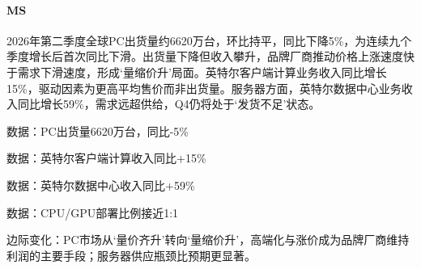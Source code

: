 \documentclass[11pt]{ctexart}
\begin{document}
\paragraph{MS} 2026年第二季度全球PC出货量约6620万台，环比持平，同比下降5\%，为连续九个季度增长后首次同比下滑。出货量下降但收入攀升，品牌厂商推动价格上涨速度快于需求下滑速度，形成‘量缩价升’局面。英特尔客户端计算业务收入同比增长15\%，驱动因素为更高平均售价而非出货量。服务器方面，英特尔数据中心业务收入同比增长59\%，需求远超供给，Q4仍将处于‘发货不足’状态。
{\small\color{refgray}数据：PC出货量6620万台，同比-5\%\par}
{\small\color{refgray}数据：英特尔客户端计算收入同比+15\%\par}
{\small\color{refgray}数据：英特尔数据中心收入同比+59\%\par}
{\small\color{refgray}数据：CPU/GPU部署比例接近1:1\par}
{\small\color{refgray}边际变化：PC市场从‘量价齐升’转向‘量缩价升’，高端化与涨价成为品牌厂商维持利润的主要手段；服务器供应瓶颈比预期更显著。\par}
\end{document}
